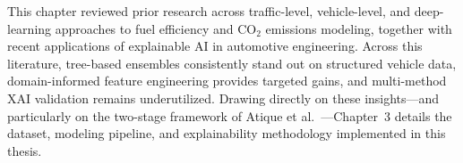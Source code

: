 This chapter reviewed prior research across traffic-level, vehicle-level, and deep-learning approaches to fuel efficiency and CO$_2$ emissions modeling, together with recent applications of explainable AI in automotive engineering. Across this literature, tree-based ensembles consistently stand out on structured vehicle data, domain-informed feature engineering provides targeted gains, and multi-method XAI validation remains underutilized. Drawing directly on these insights---and particularly on the two-stage framework of Atique et al.~\cite{atique2026explainable}---Chapter~3 details the dataset, modeling pipeline, and explainability methodology implemented in this thesis.
